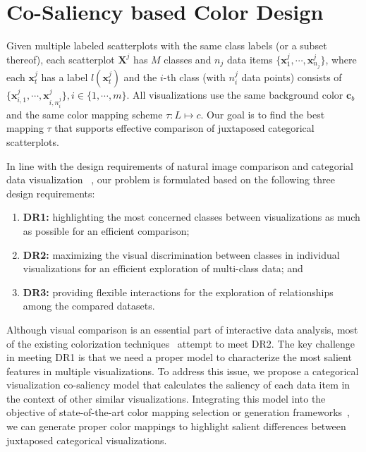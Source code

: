 \section{Co-Saliency based Color Design}
Given multiple labeled scatterplots with the same class labels (or a subset thereof), each scatterplot $\mathbf{X}^j$ has $M$ classes and $n_j$ data items $\{\mathbf{x}^j_1, \cdots, \mathbf{x}^j_{n_j}\}$, where each $\mathbf{x}^j_t$ has a label
$l(\mathbf{x}^j_t)$ and the $i$-th class (with $n^j_i$ data points) consists of $\{\mathbf{x}_{i,1}^j, \cdots , \mathbf{x}_{i,n^j_i}^j\}, i \in  \{ 1, \cdots, m \} $.
All visualizations use the same  background color $\mathbf{c}_b$ and the same color mapping scheme $\tau: L \mapsto c$. Our goal is to find the best mapping $\tau$ that supports effective comparison of juxtaposed categorical scatterplots.

In line with the design requirements of natural image comparison and categorial data visualization ~\cite{Jacobs10,Gleicher18,Lu21},
our problem is formulated based on the following three design requirements:
\begin{enumerate}[label=(\roman*),nosep]
\item \textbf{DR1:} highlighting the most concerned classes between visualizations as much as possible for an efficient comparison;
\item \textbf{DR2:} maximizing the visual discrimination between classes in individual visualizations for an efficient exploration of multi-class data; and
\item \textbf{DR3:} providing flexible interactions for the exploration of relationships among the compared datasets.
\end{enumerate}
Although visual comparison is an essential part of interactive data analysis, most of  the existing  colorization techniques~\cite{Gramazio17, Lu21} attempt to meet DR2. The key challenge in meeting DR1 is that we need a proper model to characterize the most salient features in multiple visualizations.
To address this issue, we propose a categorical visualization co-saliency model that calculates the saliency of each data item in the context of other similar visualizations. Integrating this model into the objective of state-of-the-art color mapping selection or generation frameworks~\cite{Wang2018,Lu21}, we can
generate proper color mappings to highlight salient differences between juxtaposed categorical visualizations.

